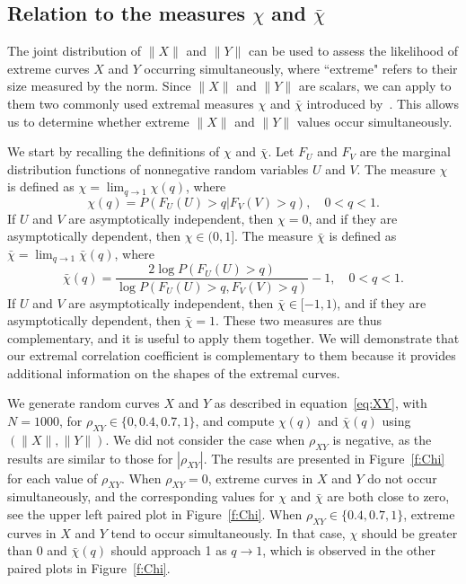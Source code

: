 \documentclass[lineno]{biometrika}
\begin{document}
\clearpage



\subsection{Relation to the measures $\chi$ and $\bar{\chi}$ } \label{ss:a_chi}


The joint distribution of $\|X\|$ and $\|Y\|$ can be used
to assess the likelihood of extreme curves $X$ and $Y$ occurring simultaneously, where ``extreme" refers to their size measured
by the norm.  Since $\|X\|$ and $\|Y\|$  are scalars,
we can apply to them two commonly used extremal measures $\chi$ and $\bar{\chi}$ introduced by~\citet{coles:heffernan:tawn:1999}.
This allows us to determine
whether extreme $\|X\|$ and $\|Y\|$ values occur simultaneously.

We start by recalling the definitions of $\chi$ and $\bar{\chi}$.
Let $F_U$ and $F_V$ are the marginal distribution functions of nonnegative random variables $U$ and $V$. The measure $\chi$ is defined as $\chi = \lim_{q \to 1} \chi(q)$, where
\[
\chi(q) = P(F_U(U)>q| F_V(V)>q), \quad 0<q<1.
\]
If $U$ and $V$ are asymptotically independent, then $\chi = 0$, and if they are asymptotically dependent, then $\chi \in (0,1]$. The measure $\bar{\chi}$ is defined as $\bar{\chi} = \lim_{q \to 1} \bar{\chi}(q)$, where
\[
\bar{\chi}(q) = \frac{2 \log P(F_U(U)>q)}{\log P(F_U(U)>q, F_V(V)>q)} -1, \quad 0<q<1.
\]
If $U$ and $V$ are asymptotically independent, then $\bar{\chi} \in [-1,1)$, and if they are asymptotically dependent, then $\bar{\chi} = 1$. These two measures are thus complementary, and it is useful
to apply them together. We will demonstrate that our extremal correlation coefficient is complementary to them because it provides additional information
on the shapes of the extremal curves.

We generate random curves $X$ and $Y$ as described in equation~\eqref{eq:XY}, with $N=1000$, for $\rho_{XY} \in \{0, 0.4, 0.7, 1\}$, and compute $\chi(q)$ and $\bar{\chi}(q)$ using  $(\|X\|, \|Y\|)$. We did not consider the case when  $\rho_{XY}$ is negative, as the results are similar to those for $|\rho_{XY}|$. The results are presented in Figure~\ref{f:Chi} for each value of $\rho_{XY}$. When $\rho_{XY}=0$, extreme curves in $X$ and $Y$ do not occur simultaneously, and the corresponding values for $\chi$ and $\bar{\chi}$ are both close to zero, see the upper left paired plot in Figure~\ref{f:Chi}. When $\rho_{XY} \in \{0.4, 0.7, 1\}$, extreme curves in $X$ and $Y$ tend to occur simultaneously. In that case, $\chi$ should be greater than 0 and $\bar{\chi}(q)$ should approach 1 as $q \to 1$, which is observed in the other paired plots in Figure~\ref{f:Chi}.
\end{document}
